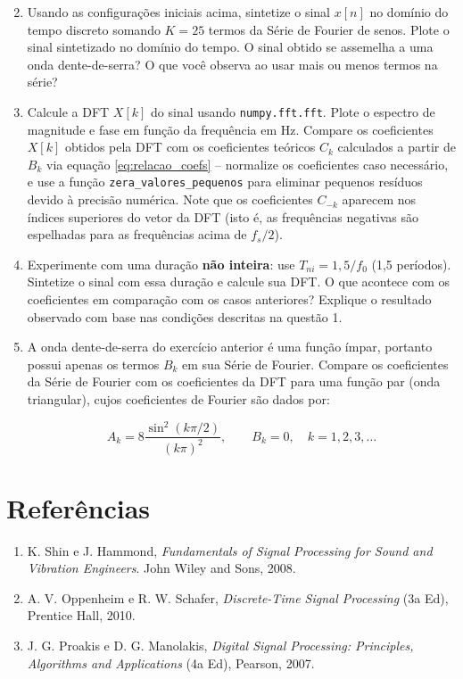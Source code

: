 \documentclass[a4paper,twoside,12pt]{article}
\begin{document}
	\begin{enumerate}	
		\setcounter{enumi}{1}
		\item Usando as configurações iniciais acima, sintetize o sinal $x[n]$ no domínio do tempo discreto somando $K = 25$ termos da Série de Fourier de senos. Plote o sinal sintetizado no domínio do tempo. O sinal obtido se assemelha a uma onda dente-de-serra? O que você observa ao usar mais ou menos termos na série?
		
		\item Calcule a DFT $X[k]$ do sinal usando \texttt{numpy.fft.fft}. Plote o espectro de magnitude e fase em função da frequência em Hz. Compare os coeficientes $X[k]$ obtidos pela DFT com os coeficientes teóricos $C_k$ calculados a partir de $B_k$ via equação \eqref{eq:relacao_coefs} -- normalize os coeficientes caso necessário, e use a função \texttt{zera\_valores\_pequenos} para eliminar pequenos resíduos devido à precisão numérica. Note que os coeficientes $C_{-k}$ aparecem nos índices superiores do vetor da DFT (isto é, as frequências negativas são espelhadas para as frequências acima de $f_s/2$).
		
		\item Experimente com uma duração \textbf{não inteira}: use $T_{ni} = 1{,}5 / f_0$ (1,5 períodos). Sintetize o sinal com essa duração e calcule sua DFT. O que acontece com os coeficientes em comparação com os casos anteriores? Explique o resultado observado com base nas condições descritas na questão 1.
		
		\item A onda dente-de-serra do exercício anterior é uma função ímpar, portanto possui apenas os termos $B_k$ em sua Série de Fourier. Compare os coeficientes da Série de Fourier com os coeficientes da DFT para uma função par (onda triangular), cujos coeficientes de Fourier são dados por:
		
		\begin{equation}
			A_k = 8 \frac{\sin^2(k \pi/2)}{(k\pi)^2}, \qquad B_k = 0, \quad k = 1, 2, 3, \ldots
			\label{eq:coef_triang_par}
		\end{equation}
		
	\end{enumerate}
	
	\section*{Referências}
	
	\begin{enumerate}
		\item K. Shin e J. Hammond, \textit{Fundamentals of Signal Processing for Sound and Vibration Engineers}. John Wiley and Sons, 2008.
		\item A. V. Oppenheim e R. W. Schafer, \textit{Discrete-Time Signal Processing} (3a Ed), Prentice Hall, 2010.
		\item J. G. Proakis e D. G. Manolakis, \textit{Digital Signal Processing: Principles, Algorithms and Applications} (4a Ed), Pearson, 2007.
	\end{enumerate}
	
\end{document}
